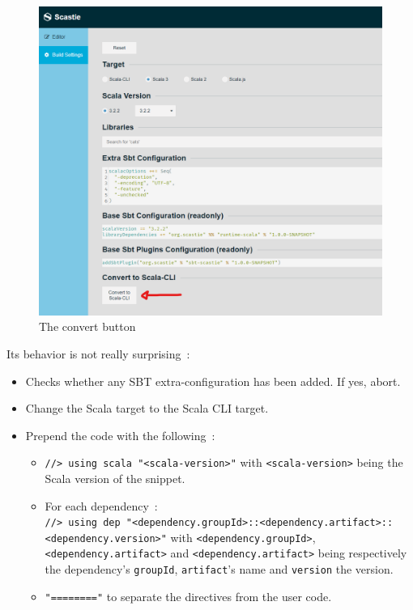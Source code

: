 \documentclass{article}
\begin{document}
\begin{figure}[H]
    \centering
    \includegraphics[width=\linewidth]{./scastie_convert.png}
    \caption{The convert button}
\end{figure}

Its behavior is not really surprising~:

\begin{itemize}
    \item Checks whether any SBT extra-configuration has been added. If yes, abort.
    \item Change the Scala target to the Scala CLI target.
    \item Prepend the code with the following~:
    \begin{itemize}
        \item \lstinline{//> using scala "<scala-version>"} with \lstinline{<scala-version>} being the Scala version of the snippet.
        \item For each dependency~: \\ \lstinline{//> using dep "<dependency.groupId>::<dependency.artifact>::<dependency.version>"} with \lstinline{<dependency.groupId>}, \lstinline{<dependency.artifact>} and \lstinline{<dependency.artifact>} being respectively the dependency's \lstinline{groupId}, \lstinline{artifact}'s name and \lstinline{version} the version.
        \item \lstinline{"========"} to separate the directives from the user code.
    \end{itemize}
\end{itemize}
\end{document}
